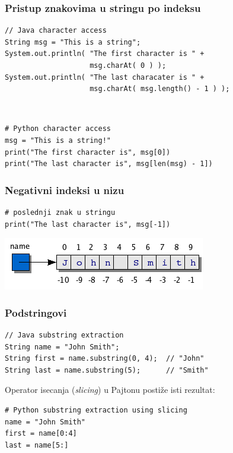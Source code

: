 \documentclass[compress]{beamer}
\begin{document}
\begin{frame}[fragile]
\frametitle{Pristup znakovima u stringu po indeksu}
\begin{verbatim}
// Java character access
String msg = "This is a string";
System.out.println( "The first character is " +
                    msg.charAt( 0 ) );
System.out.println( "The last characater is " +
                    msg.charAt( msg.length() - 1 ) );
\end{verbatim}

\ %

\begin{verbatim}
# Python character access
msg = "This is a string!"
print("The first character is", msg[0])
print("The last character is", msg[len(msg) - 1])
\end{verbatim}
\end{frame}

\begin{frame}[fragile]
\frametitle{Negativni indeksi u nizu}
\begin{verbatim}
# poslednji znak u stringu
print("The last character is", msg[-1])
\end{verbatim}
\begin{center}
\includegraphics[scale=0.7]{strindex.png}
\end{center}
\end{frame}

\begin{frame}[fragile]
\frametitle{Podstringovi}
\begin{verbatim}
// Java substring extraction
String name = "John Smith";
String first = name.substring(0, 4);  // "John"
String last = name.substring(5);      // "Smith"
\end{verbatim}

Operator isecanja (\textit{slicing}) u Pajtonu postiže isti rezultat:

\begin{verbatim}
# Python substring extraction using slicing
name = "John Smith"
first = name[0:4]
last = name[5:]
\end{verbatim}
\end{frame}
\end{document}
